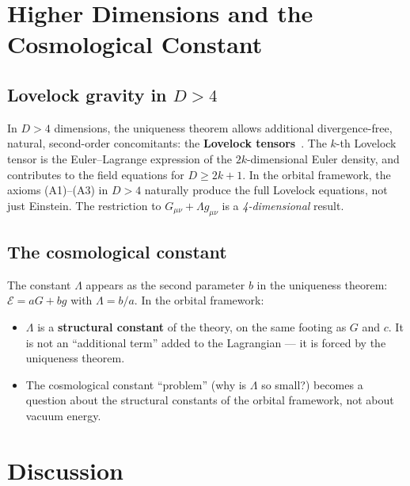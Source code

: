 \documentclass[12pt]{article}
\theoremstyle{plain}
\theoremstyle{definition}
\theoremstyle{remark}
\begin{document}
\section{Higher Dimensions and the Cosmological Constant}
\label{sec:higher}

\subsection{Lovelock gravity in $D > 4$}

In $D > 4$ dimensions, the uniqueness theorem allows additional divergence-free, natural, second-order concomitants: the \textbf{Lovelock tensors}~\cite{lovelock1971}. The $k$-th Lovelock tensor is the Euler--Lagrange expression of the $2k$-dimensional Euler density, and contributes to the field equations for $D \geq 2k+1$. In the orbital framework, the axioms (A1)--(A3) in $D > 4$ naturally produce the full Lovelock equations, not just Einstein. The restriction to $G_{\mu\nu} + \Lambda g_{\mu\nu}$ is a \emph{4-dimensional} result.

\subsection{The cosmological constant}

The constant $\Lambda$ appears as the second parameter $b$ in the uniqueness theorem: $\mathcal{E} = aG + bg$ with $\Lambda = b/a$. In the orbital framework:
\begin{itemize}
    \item $\Lambda$ is a \textbf{structural constant} of the theory, on the same footing as $G$ and $c$. It is not an ``additional term'' added to the Lagrangian --- it is forced by the uniqueness theorem.
    \item The cosmological constant ``problem'' (why is $\Lambda$ so small?) becomes a question about the structural constants of the orbital framework, not about vacuum energy.
\end{itemize}


\section{Discussion}
\label{sec:discussion}
\end{document}
